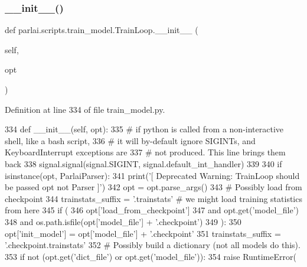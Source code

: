 \subsubsection{\texorpdfstring{\+\_\+\+\_\+init\+\_\+\+\_\+()}{\_\_init\_\_()}}
{\footnotesize\ttfamily def parlai.\+scripts.\+train\+\_\+model.\+Train\+Loop.\+\_\+\+\_\+init\+\_\+\+\_\+ (\begin{DoxyParamCaption}\item[{}]{self,  }\item[{}]{opt }\end{DoxyParamCaption})}



Definition at line 334 of file train\+\_\+model.\+py.


\begin{DoxyCode}
334     \textcolor{keyword}{def }\_\_init\_\_(self, opt):
335         \textcolor{comment}{# if python is called from a non-interactive shell, like a bash script,}
336         \textcolor{comment}{# it will by-default ignore SIGINTs, and KeyboardInterrupt exceptions are}
337         \textcolor{comment}{# not produced. This line brings them back}
338         signal.signal(signal.SIGINT, signal.default\_int\_handler)
339 
340         \textcolor{keywordflow}{if} isinstance(opt, ParlaiParser):
341             print(\textcolor{stringliteral}{'[ Deprecated Warning: TrainLoop should be passed opt not Parser ]'})
342             opt = opt.parse\_args()
343         \textcolor{comment}{# Possibly load from checkpoint}
344         trainstats\_suffix = \textcolor{stringliteral}{'.trainstats'}  \textcolor{comment}{# we might load training statistics from here}
345         \textcolor{keywordflow}{if} (
346             opt[\textcolor{stringliteral}{'load\_from\_checkpoint'}]
347             \textcolor{keywordflow}{and} opt.get(\textcolor{stringliteral}{'model\_file'})
348             \textcolor{keywordflow}{and} os.path.isfile(opt[\textcolor{stringliteral}{'model\_file'}] + \textcolor{stringliteral}{'.checkpoint'})
349         ):
350             opt[\textcolor{stringliteral}{'init\_model'}] = opt[\textcolor{stringliteral}{'model\_file'}] + \textcolor{stringliteral}{'.checkpoint'}
351             trainstats\_suffix = \textcolor{stringliteral}{'.checkpoint.trainstats'}
352         \textcolor{comment}{# Possibly build a dictionary (not all models do this).}
353         \textcolor{keywordflow}{if} \textcolor{keywordflow}{not} (opt.get(\textcolor{stringliteral}{'dict\_file'}) \textcolor{keywordflow}{or} opt.get(\textcolor{stringliteral}{'model\_file'})):
354             \textcolor{keywordflow}{raise} RuntimeError(

\end{DoxyCode}
